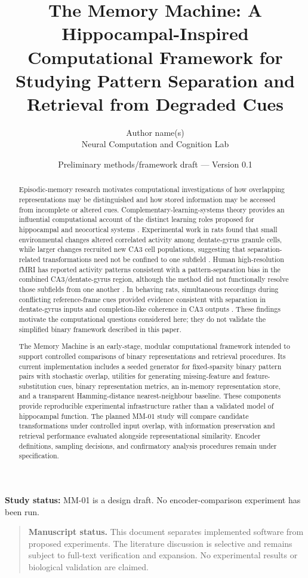 \documentclass[11pt,a4paper]{article}
\title{The Memory Machine: A Hippocampal-Inspired Computational Framework for Studying Pattern Separation and Retrieval from Degraded Cues}
\author{Author name(s)\\Neural Computation and Cognition Lab}
\date{Preliminary methods/framework draft --- Version 0.1}
\begin{document}
\maketitle

\begin{center}
\textbf{Study status:} MM-01 is a design draft. No encoder-comparison experiment has been run.
\end{center}

\begin{quote}
\textbf{Manuscript status.} This document separates implemented software from proposed experiments. The literature discussion is selective and remains subject to full-text verification and expansion. No experimental results or biological validation are claimed.
\end{quote}

\begin{abstract}
Episodic-memory research motivates computational investigations of how overlapping representations may be distinguished and how stored information may be accessed from incomplete or altered cues. Complementary-learning-systems theory provides an influential computational account of the distinct learning roles proposed for hippocampal and neocortical systems \citep{mcclelland1995}. Experimental work in rats found that small environmental changes altered correlated activity among dentate-gyrus granule cells, while larger changes recruited new CA3 cell populations, suggesting that separation-related transformations need not be confined to one subfield \citep{leutgeb2007}. Human high-resolution fMRI has reported activity patterns consistent with a pattern-separation bias in the combined CA3/dentate-gyrus region, although the method did not functionally resolve those subfields from one another \citep{bakker2008}. In behaving rats, simultaneous recordings during conflicting reference-frame cues provided evidence consistent with separation in dentate-gyrus inputs and completion-like coherence in CA3 outputs \citep{neunuebel2014}. These findings motivate the computational questions considered here; they do not validate the simplified binary framework described in this paper.

The Memory Machine is an early-stage, modular computational framework intended to support controlled comparisons of binary representations and retrieval procedures. Its current implementation includes a seeded generator for fixed-sparsity binary pattern pairs with stochastic overlap, utilities for generating missing-feature and feature-substitution cues, binary representation metrics, an in-memory representation store, and a transparent Hamming-distance nearest-neighbour baseline. These components provide reproducible experimental infrastructure rather than a validated model of hippocampal function. The planned MM-01 study will compare candidate transformations under controlled input overlap, with information preservation and retrieval performance evaluated alongside representational similarity. Encoder definitions, sampling decisions, and confirmatory analysis procedures remain under specification.
\end{abstract}
\end{document}
